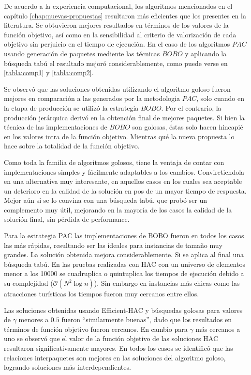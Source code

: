 




De acuerdo a la experiencia computacional, los algoritmos mencionados en el capítulo \autoref{chap:nuevas-propuestas} resultaron más eficientes que los presentes en la literatura. Se obtuvieron mejores resultados en términos de los valores de la función objetivo, así como en la sensibilidad al criterio de valorización de cada objetivo sin perjuicio en el tiempo de ejecución. En el caso de los algoritmos $PAC$ usando generación de paquetes mediente las técnicas $BOBO$ y aplicando la búsqueda tabú el resultado mejoró considerablemente, como puede verse en \autoref{tabla:comp1} y \autoref{tabla:comp2}.

Se observó que las soluciones obtenidas utilizando el algoritmo goloso fueron mejores en comparación a las generados por la metodologia $PAC$, solo cuando en la etapa de producción se utilizó la estrategia $BOBO$. Por el contrario, la producción jerárquica derivó en la obtención final de mejores paquetes. Si bien la técnica de las implementaciones de $BOBO$ son golosas, éstas solo hacen hincapié en los valores intra de la función objetivo. Mientras qué la nueva propuesta lo hace sobre la totalidad de la función objetivo. 

Como toda la familia de algoritmos golosos, tiene la ventaja de contar con implementaciones simples y fácilmente adaptables a los cambios. Conviretiendola en una alternativa muy interesante, en aquellos casos en los cuales sea aceptable un deterioro en la calidad de la solución en pos de un mayor tiempo de respuesta. Mejor aún si se lo convina con una búsqueda tabú, que probó ser un complemento muy útil, mejorando en la mayoría de los casos la calidad de la solución final, sin pérdida de performance. 

Para la estrategia PAC las implementaciones de BOBO fueron en todos los casos las más rápidas, resultando ser las ideales para instancias de tamaño muy grandes. La solución obtenida mejora considerablemente. Si se aplica al final una búsqueda tabú. En las pruebas realizadas con HAC con un universo de elementos menor a los 10000 se cuadruplica o quintuplica los tiempos de ejecución debido a su complejidad ($\mathcal{O}(N^{2}\log n)$). Sin embargo en instancias más chicas como las atracciones turísticas los tiempos fueron muy cercanos entre ellos.

Las soluciones obtenidas usando Efficient-HAC y búsquedas golosas para valores de $\gamma$ menores a $0.5$ fueron \textquotedblleft similarmente buenas\textquotedblright , dado que los resultados en términos de función objetivo fueron cercanos. En cambio para $\gamma$ más cercanos a uno se observó que el valor de la función objetivo de las soluciones HAC resultaron significativamente mayores. En todos los casos se identificó que las relaciones interpaquetes son mejores en las soluciones del algoritmo goloso, logrando soluciones más interdependientes.

